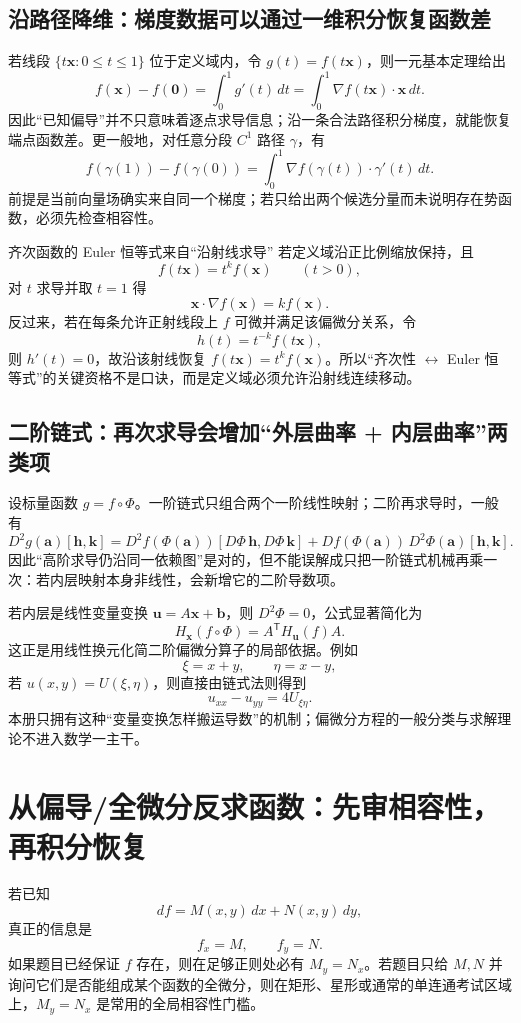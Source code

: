 \documentclass[11pt,a4paper,fontset=fandol]{ctexart}
\begin{document}
\subsection{沿路径降维：梯度数据可以通过一维积分恢复函数差}
若线段 $\{t\mathbf x:0\le t\le1\}$ 位于定义域内，令 $g(t)=f(t\mathbf x)$，则一元基本定理给出
\[
f(\mathbf x)-f(\mathbf0)
=\int_0^1 g'(t)\,dt
=\int_0^1\nabla f(t\mathbf x)\cdot\mathbf x\,dt.
\]
因此“已知偏导”并不只意味着逐点求导信息；沿一条合法路径积分梯度，就能恢复端点函数差。更一般地，对任意分段 $C^1$ 路径 $\gamma$，有
\[
f(\gamma(1))-f(\gamma(0))
=\int_0^1\nabla f(\gamma(t))\cdot\gamma'(t)\,dt.
\]
前提是当前向量场确实来自同一个梯度；若只给出两个候选分量而未说明存在势函数，必须先检查相容性。

\begin{corebox}{齐次函数的 Euler 恒等式来自“沿射线求导”}
若定义域沿正比例缩放保持，且
\[
f(t\mathbf x)=t^k f(\mathbf x)\qquad(t>0),
\]
对 $t$ 求导并取 $t=1$ 得
\[
\boxed{\mathbf x\cdot\nabla f(\mathbf x)=k f(\mathbf x).}
\]
反过来，若在每条允许正射线段上 $f$ 可微并满足该偏微分关系，令
\[
h(t)=t^{-k}f(t\mathbf x),
\]
则 $h'(t)=0$，故沿该射线恢复 $f(t\mathbf x)=t^k f(\mathbf x)$。所以“齐次性 $\leftrightarrow$ Euler 恒等式”的关键资格不是口诀，而是定义域必须允许沿射线连续移动。
\end{corebox}

\subsection{二阶链式：再次求导会增加“外层曲率 + 内层曲率”两类项}
设标量函数 $g=f\circ\Phi$。一阶链式只组合两个一阶线性映射；二阶再求导时，一般有
\[
D^2g(\mathbf a)[\mathbf h,\mathbf k]
=D^2f(\Phi(\mathbf a))[D\Phi\,\mathbf h,D\Phi\,\mathbf k]
+Df(\Phi(\mathbf a))\,D^2\Phi(\mathbf a)[\mathbf h,\mathbf k].
\]
因此“高阶求导仍沿同一依赖图”是对的，但不能误解成只把一阶链式机械再乘一次：若内层映射本身非线性，会新增它的二阶导数项。

若内层是线性变量变换 $\mathbf u=A\mathbf x+\mathbf b$，则 $D^2\Phi=0$，公式显著简化为
\[
\boxed{H_{\mathbf x}(f\circ\Phi)=A^{\mathsf T}H_{\mathbf u}(f)A.}
\]
这正是用线性换元化简二阶偏微分算子的局部依据。例如
\[
\xi=x+y,\qquad \eta=x-y,
\]
若 $u(x,y)=U(\xi,\eta)$，则直接由链式法则得到
\[
u_{xx}-u_{yy}=4U_{\xi\eta}.
\]
本册只拥有这种“变量变换怎样搬运导数”的机制；偏微分方程的一般分类与求解理论不进入数学一主干。

\section{从偏导/全微分反求函数：先审相容性，再积分恢复}
若已知
\[
df=M(x,y)\,dx+N(x,y)\,dy,
\]
真正的信息是
\[
f_x=M,\qquad f_y=N.
\]
如果题目已经保证 $f$ 存在，则在足够正则处必有 $M_y=N_x$。若题目只给 $M,N$ 并询问它们是否能组成某个函数的全微分，则在矩形、星形或通常的单连通考试区域上，$M_y=N_x$ 是常用的全局相容性门槛。
\end{document}
